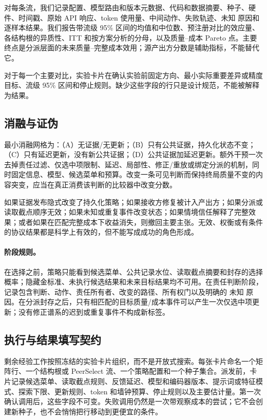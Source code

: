 \documentclass[UTF8,twocolumn]{ctexart}
\newcommand{\unknown}{\textsc{未知}}
\begin{document}
对每条流，我们记录配置、模型路由和版本元数据、代码和数据摘要、种子、硬件、时间戳、原始 API 响应、token 使用量、中间动作、失败轨迹、\unknown{} 原因和逐样本结果。我们报告带流级 95\% 区间的均值和中位数、预注册对比的效应量、各结构根的异质性、ITT 和按方案分析的分母，以及质量--成本 Pareto 点。主要终点是分派层面的未来质量--完整成本效用；源产出方分数是辅助指标，不能替代它。

对于每一个主要对比，实验卡片在确认实验前固定方向、最小实际重要差异或精度目标、流级 95\% 区间和停止规则。缺少这些字段的行只是设计规范，不能被解释为结果。

\subsection{消融与证伪}
最小消融网格为：（A）无证据/无更新；（B）只有公共证据，持久化状态不变；（C）只有延迟更新，没有新公共证据；（D）公共证据加延迟更新。额外干预一次去掉责任过滤、仅选中项限制、延迟、局部性、修正/重放或绑定分派的机制，同时固定信息、模型、候选菜单和预算。改变一条可见判断而保持终局质量不变的内容突变，应当在真正消费该判断的比较器中改变分数。

如果证据发布隐式改变了持久化策略；如果接收方修复被计入产出方；如果分派或读取截点顺序无效；如果未知或重复事件改变状态；如果情境信任解释了完整效果；或者如果在匹配完整成本下收益消失，则撤回主要主张。无效、权衡或有条件的协议结果都是科学上有效的，但不能写成成功的角色形成。

\paragraph{阶段规则。} 在选择之前，策略只能看到候选菜单、公共记录水位、读取截点摘要和封存的选择概率；隐藏金标准、未执行候选结果和未来目标结果均不可用。在责任判断阶段，记录包含判断、动作、责任所有者、改变的路径、所有权门以及明确的 \unknown{} 原因。在分派封存之后，只有相匹配的目标质量/成本事件可以产生一次仅选中项更新；没有修正谱系的迟到或重复事件不构成新标签。

\subsection{执行与结果填写契约}
剩余经验工作按照冻结的实验卡片组织，而不是开放式搜索。每张卡片命名一个矩阵行、一个结构根或 PeerSelect 流、一个策略配置和一个种子集合。派发前，卡片记录候选菜单、读取截点规则、反馈延迟、模型和编码器版本、提示词或特征模式、探索下限、更新规则、token 和墙钟预算、停止规则以及主要估计量。第一次确认调用后，这些字段不可变。失败调用仍然是一次带观察成本的尝试；它不会创建新种子，也不会悄悄把行移动到更便宜的条件。
\end{document}

